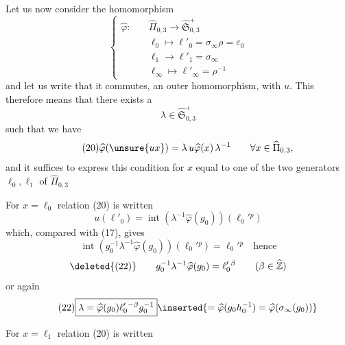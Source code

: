 
Let us now consider the homomorphism 
\[
\tag{18}
\left\{
\begin{aligned}
\widehat\varphi:\quad &\widehat\Pi_{0,3}\longrightarrow
  \widehat{\mathfrak S}_{0,3}^{+}\\
&\ell_0\longmapsto\ell'_0=\sigma_\infty\rho=\varepsilon_0\\
&\ell_1\longrightarrow\ell'_1=\sigma_\infty\\
&\ell_\infty\longmapsto\ell'_\infty=\rho^{-1}
\end{aligned}
\right.
\]
and let us write that it commutes,  an outer homomorphism, with $u$.
This therefore means that there exists a
\[
\tag{19}
\lambda\in\widehat{\mathfrak S}_{0,3}^{+}
\]
such that we have
\[
\tag{20}
\widehat\varphi(\unsure{ux})=\lambda\,u\widehat\varphi(x)\,\lambda^{-1}
\qquad \forall x\in\widehat\Pi_{0,3},
\]
and it suffices to express this condition for $x$ equal to one of the two
generators $\ell_0,\ell_1$ of $\widehat\Pi_{0,3}$

For $x=\ell_0$ relation (20) is written
\[
\tag{21}
u(\ell'_0)=\operatorname{int}(\lambda^{-1}\widehat\varphi(g_0))(\ell_0'{}^{p})
\]
which, compared with (17), gives
\[
\operatorname{int}(g_0^{-1}\lambda^{-1}\widehat\varphi(g_0))(\ell_0'{}^{p})
=\ell_0'{}^{p}\quad\text{hence}
\]
\[
\deleted{(22)}\qquad
g_0^{-1}\lambda^{-1}\widehat\varphi(g_0)=\ell_0'{}^{\beta}
\qquad(\beta\in\widehat{\mathbb Z})
\]
or again
\[
\tag{22}
\boxed{\lambda=\widehat\varphi(g_0)\ell_0'{}^{-\beta}g_0^{-1}}
\inserted{=\widehat\varphi(g_0h_0^{-1})=\widehat\varphi(\sigma_\infty(g_0))}
\]

For $x=\ell_1$ relation (20) is written


